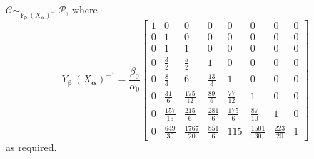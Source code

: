 $\mathcal{C} \sim_{Y_{\boldsymbol{\beta}}\,\left(X_{\boldsymbol{\alpha}}\right)^{-1}}\mathcal{P}$, where
\begin{displaymath}
{Y_{\boldsymbol{\beta}}\,\left(X_{\boldsymbol{\alpha}}\right)^{-1}} = \frac{\beta_{0}}{\alpha_{0}} \left[\begin{matrix}1 & 0 & 0 & 0 & 0 & 0 & 0 & 0\\0 & 1 & 0 & 0 & 0 & 0 & 0 & 0\\0 & 1 & 1 & 0 & 0 & 0 & 0 & 0\\0 & \frac{3}{2} & \frac{5}{2} & 1 & 0 & 0 & 0 & 0\\0 & \frac{8}{3} & 6 & \frac{13}{3} & 1 & 0 & 0 & 0\\0 & \frac{31}{6} & \frac{175}{12} & \frac{89}{6} & \frac{77}{12} & 1 & 0 & 0\\0 & \frac{157}{15} & \frac{215}{6} & \frac{281}{6} & \frac{175}{6} & \frac{87}{10} & 1 & 0\\0 & \frac{649}{30} & \frac{1767}{20} & \frac{851}{6} & 115 & \frac{1501}{30} & \frac{223}{20} & 1\end{matrix}\right]
\end{displaymath}
as required.






